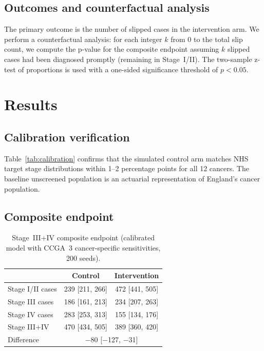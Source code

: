\documentclass[11pt,letter]{article}
\begin{document}
\subsection{Outcomes and counterfactual analysis}
\label{sec:counterfactual}

The primary outcome is the number of slipped cases in the intervention arm.
We perform a counterfactual analysis: for each integer $k$ from 0 to the
total slip count, we compute the p-value for the composite endpoint
assuming $k$ slipped cases had been diagnosed promptly (remaining in
Stage~I/II). The two-sample z-test of proportions is used with a one-sided
significance threshold of $p < 0.05$.


\section{Results}
\label{sec:results}

\subsection{Calibration verification}

Table~\ref{tab:calibration} confirms that the simulated control arm matches
NHS target stage distributions within 1--2 percentage points for all 12
cancers. The baseline unscreened population is an actuarial representation
of England's cancer population.


\subsection{Composite endpoint}

\begin{table}[!ht]\centering
\caption{Stage~III+IV composite endpoint (calibrated model with CCGA~3
cancer-specific sensitivities, 200 seeds).}
\label{tab:composite}
\begin{tabular}{lcc}\toprule
 & Control & Intervention \\ \midrule
Stage I/II cases  & 239 [211, 266] & 472 [441, 505] \\
Stage III cases   & 186 [161, 213] & 234 [207, 263] \\
Stage IV cases    & 283 [253, 313] & 155 [134, 176] \\
\midrule
Stage III+IV      & 470 [434, 505] & 389 [360, 420] \\
Difference        & \multicolumn{2}{c}{$-$80 [$-$127, $-$31]} \\
\bottomrule
\end{tabular}
\end{table}
\end{document}
